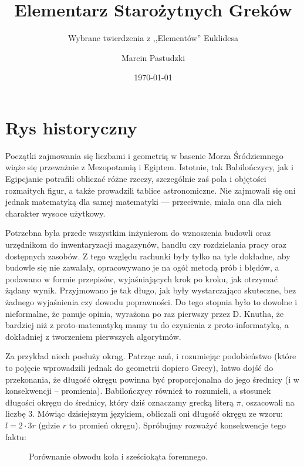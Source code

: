 \documentclass[12pt, a4paper]{scrartcl}
\title{Elementarz Starożytnych Greków}
\subtitle{Wybrane twierdzenia z ,,Elementów'' Euklidesa}
\author{Marcin Pastudzki}
\date{\today}
\begin{document}
\maketitle

\section*{Rys historyczny}

Początki zajmowania się liczbami i geometrią w basenie Morza Śródziemnego wiąże
się przeważnie z Mezopotamią i Egiptem. Istotnie, tak Babilończycy, jak i
Egipcjanie potrafili obliczać różne rzeczy, szczególnie zaś pola i objętości
rozmaitych figur, a także prowadzili tablice astronomiczne. Nie zajmowali się
oni jednak matematyką dla samej matematyki --- przeciwnie, miała ona dla nich
charakter wysoce użytkowy.

Potrzebna była przede wszystkim inżynierom do wznoszenia budowli oraz urzędnikom
do inwentaryzacji magazynów, handlu czy rozdzielania pracy oraz dostępnych
zasobów. Z tego względu rachunki były tylko na tyle dokładne, aby budowle się
nie zawalały, opracowywano je na ogół metodą prób i błędów, a podawano w
formie przepisów, wyjaśniających krok po kroku, jak otrzymać żądany wynik.
Przyjmowano je tak długo, jak były wystarczająco skuteczne, bez żadnego
wyjaśnienia czy dowodu poprawności. Do tego stopnia było to dowolne i
nieformalne, że panuje opinia, wyrażona po raz pierwszy przez D. Knutha, że
bardziej niż z proto-matematyką mamy tu do czynienia z proto-informatyką, a
dokładniej z tworzeniem pierwszych algorytmów.

Za przykład niech posłuży okrąg. Patrząc nań, i rozumiejąc podobieństwo (które
to pojęcie wprowadzili jednak do geometrii dopiero Grecy), łatwo dojść do
przekonania, że długość okręgu powinna być proporcjonalna do jego średnicy
(i w konsekwencji -- promienia). Babilończycy również to rozumieli, a stosunek
długości okręgu do średnicy, który dziś oznaczamy grecką literą $\pi$,
oszacowali na liczbę $3$. Mówiąc dzisiejszym językiem, obliczali oni długość
okręgu ze wzoru: $l = 2 \cdot 3r$ (gdzie $r$ to promień okręgu). Spróbujmy
rozważyć konsekwencje tego faktu:

\begin{figure}[h!]
    \begin{center}
      \caption{Porównanie obwodu koła i sześciokąta foremnego.}
  \end{center}
\end{figure}
\end{document}
